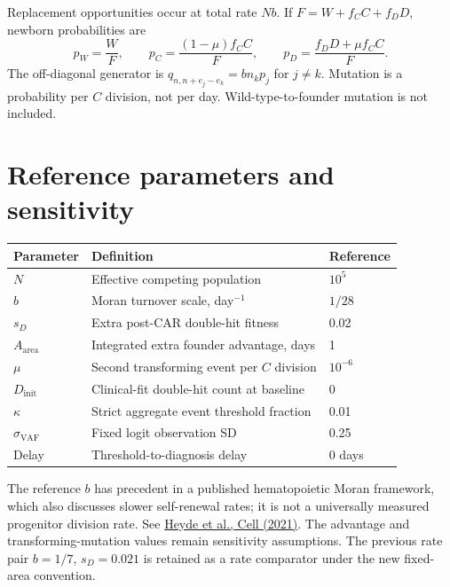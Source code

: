 \documentclass[11pt]{article}
\begin{document}
Replacement opportunities occur at total rate $Nb$. If $F=W+f_CC+f_DD$, newborn probabilities are
\[
p_W=\frac WF,\qquad p_C=\frac{(1-\mu)f_CC}{F},\qquad p_D=\frac{f_DD+\mu f_CC}{F}.
\]
The off-diagonal generator is $q_{n,n+e_j-e_k}=bn_kp_j$ for $j\ne k$. Mutation is a probability per $C$ division, not per day. Wild-type-to-founder mutation is not included.

\section{Reference parameters and sensitivity}
\begin{center}\begin{tabular}{@{}lp{}l@{}}\toprule
Parameter & Definition & Reference\\\midrule
$N$ & Effective competing population & $10^5$\\
$b$ & Moran turnover scale, day$^{-1}$ & $1/28$\\
$s_D$ & Extra post-CAR double-hit fitness & 0.02\\
$A_{\mathrm{area}}$ & Integrated extra founder advantage, days & 1\\
$\mu$ & Second transforming event per $C$ division & $10^{-6}$\\
$D_{\mathrm{init}}$ & Clinical-fit double-hit count at baseline & 0\\
$\kappa$ & Strict aggregate event threshold fraction & 0.01\\
$\sigma_{\mathrm{VAF}}$ & Fixed logit observation SD & 0.25\\
Delay & Threshold-to-diagnosis delay & 0 days\\\bottomrule
\end{tabular}\end{center}
The reference $b$ has precedent in a published hematopoietic Moran framework, which also discusses slower self-renewal rates; it is not a universally measured progenitor division rate. See \href{https://pubmed.ncbi.nlm.nih.gov/33636128/}{Heyde et al., Cell (2021)}. The advantage and transforming-mutation values remain sensitivity assumptions. The previous rate pair $b=1/7$, $s_D=0.021$ is retained as a rate comparator under the new fixed-area convention.
\end{document}
